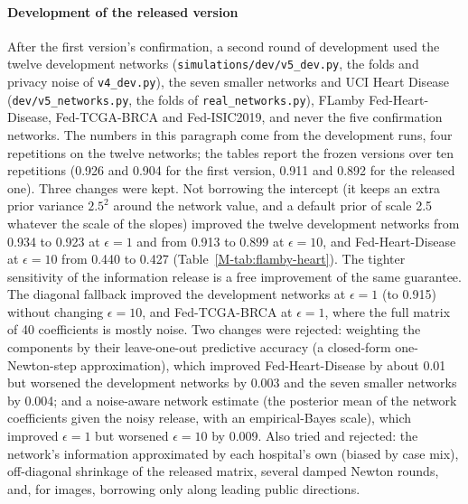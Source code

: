 \documentclass[acmsmall,screen,nonacm]{acmart}
\theoremstyle{acmdefinition}
\begin{document}
\paragraph{Development of the released version} After the first version's confirmation, a second round of development used the twelve development networks (\texttt{simulations/dev/v5\_dev.py}, the folds and privacy noise of \texttt{v4\_dev.py}), the seven smaller networks and UCI Heart Disease (\texttt{dev/v5\_networks.py}, the folds of \texttt{real\_networks.py}), FLamby Fed-Heart-Disease, Fed-TCGA-BRCA and Fed-ISIC2019, and never the five confirmation networks. The numbers in this paragraph come from the development runs, four repetitions on the twelve networks; the tables report the frozen versions over ten repetitions (0.926 and 0.904 for the first version, 0.911 and 0.892 for the released one). Three changes were kept. Not borrowing the intercept (it keeps an extra prior variance $2.5^2$ around the network value, and a default prior of scale 2.5 whatever the scale of the slopes) improved the twelve development networks from 0.934 to 0.923 at $\epsilon=1$ and from 0.913 to 0.899 at $\epsilon=10$, and Fed-Heart-Disease at $\epsilon=10$ from 0.440 to 0.427 (Table~\ref{M-tab:flamby-heart}). The tighter sensitivity of the information release is a free improvement of the same guarantee. The diagonal fallback improved the development networks at $\epsilon=1$ (to 0.915) without changing $\epsilon=10$, and Fed-TCGA-BRCA at $\epsilon=1$, where the full matrix of 40 coefficients is mostly noise. Two changes were rejected: weighting the components by their leave-one-out predictive accuracy (a closed-form one-Newton-step approximation), which improved Fed-Heart-Disease by about 0.01 but worsened the development networks by 0.003 and the seven smaller networks by 0.004; and a noise-aware network estimate (the posterior mean of the network coefficients given the noisy release, with an empirical-Bayes scale), which improved $\epsilon=1$ but worsened $\epsilon=10$ by 0.009. Also tried and rejected: the network's information approximated by each hospital's own (biased by case mix), off-diagonal shrinkage of the released matrix, several damped Newton rounds, and, for images, borrowing only along leading public directions.
\end{document}
